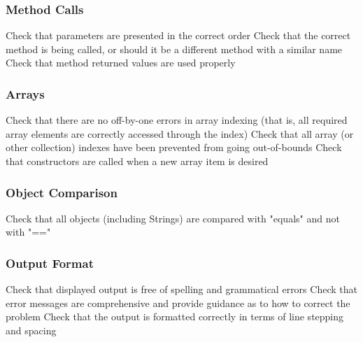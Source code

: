 \subsubsection{Method Calls}
\begin{itemize}
		Check that parameters are presented in the correct order
		Check that the correct method is being called, or should it be a different method with a similar name
		Check that method returned values are used properly
\end{itemize}

\subsubsection{Arrays}
\begin{itemize}
		Check that there are no off-by-one errors in array indexing (that is, all required array elements are correctly accessed through the index)
		Check that all array (or other collection) indexes have been prevented from going out-of-bounds
		Check that constructors are called when a new array item is desired
\end{itemize}

\subsubsection{Object Comparison}
\begin{itemize}
		Check that all objects (including Strings) are compared with "equals" and not with "=="
\end{itemize}

\subsubsection{Output Format}
\begin{itemize}
		Check that displayed output is free of spelling and grammatical errors
		Check that error messages are comprehensive and provide guidance as to how to correct the problem
		Check that the output is formatted correctly in terms of line stepping and spacing
\end{itemize}

